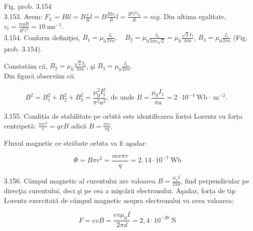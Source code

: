 \documentclass[10pt]{article}
\begin{document}
Fig. prob. 3.154\\
3.153. Avem: $F_{L}=B l l=B \frac{e}{R} l=B \frac{B l v_{l}}{R} l=\frac{B^{2} l^{2} v_{l}}{R}=m g$. Din ultima egalitate, $v_{l}=\frac{m g R}{B^{2} l^{2}}=10 \mathrm{~ms}^{-1}$.\\
3.154. Conform definiţiei, $B_{1}=\mu_{0} \frac{I_{1}}{2 \pi a}, \quad B_{2}=\mu_{0} \frac{I_{2}}{2 \pi a \sqrt{2}}=\mu_{0} \frac{\sqrt{2} I_{2}}{4 \pi a}$, $B_{3}=\mu_{0} \frac{I_{3}}{2 \pi a}$ (Fig. prob. 3.154).

Constatăm că, $B_{2}=\mu_{0} \frac{\sqrt{2} I_{2}}{4 \pi a}$, şi $B_{3}=\mu_{0} \frac{I_{1}}{2 \pi a}$.\\
Din figură observăm că:

$$
B^{2}=B_{1}^{2}+B_{2}^{2}+B_{3}^{2}=\frac{\mu_{0}^{2} I_{1}^{2}}{\pi^{2} a^{2}} \text {, de unde } B=\frac{\mu_{0} I_{1}}{\pi a}=2 \cdot 10^{-4} \mathrm{~Wb} \cdot \mathrm{~m}^{-2} \text {. }
$$

3.155. Condiția de stabilitate pe orbită este identificarea forței Lorentz cu forța centripetă: $\frac{m v^{2}}{r}=q v B$ adică $B=\frac{m v}{r q}$.

Fluxul magnetic ce străbate orbita va fi aşadar:

$$
\Phi=B \pi r^{2}=\frac{m v \pi r}{q}=2,14 \cdot 10^{-7} \mathrm{~Wb}
$$

3.156. Câmpul magnetic al curentului are valoarea $B=\frac{\mu_{0} I}{2 \pi d}$, find perpendicular pe direcţia curentului, deci şi pe cea a mişcǎrii electronului. Aşadar, forța de tip Lorentz exercitată de câmpul magnetic asupra electronului va avea valoarea:

$$
F=e v B=\frac{e v \mu_{0} I}{2 \pi d}=2,4 \cdot 10^{-20} \mathrm{~N}
$$
\end{document}
